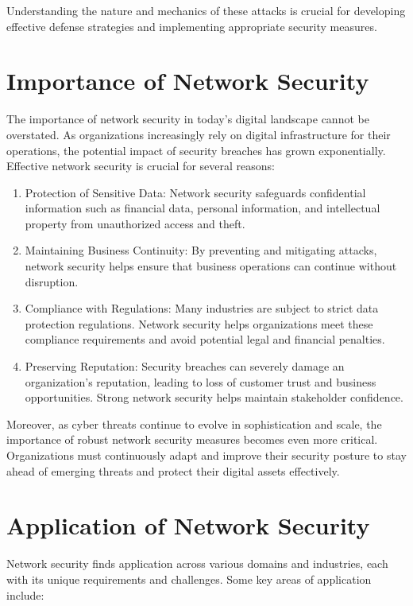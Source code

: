 \documentclass{article}
\begin{document}
Understanding the nature and mechanics of these attacks is crucial for developing effective defense strategies and implementing appropriate security measures.

\section{Importance of Network Security}

The importance of network security in today's digital landscape cannot be overstated. As organizations increasingly rely on digital infrastructure for their operations, the potential impact of security breaches has grown exponentially. Effective network security is crucial for several reasons:

\begin{enumerate}
    \item Protection of Sensitive Data: Network security safeguards confidential information such as financial data, personal information, and intellectual property from unauthorized access and theft.
    \item Maintaining Business Continuity: By preventing and mitigating attacks, network security helps ensure that business operations can continue without disruption.
    \item Compliance with Regulations: Many industries are subject to strict data protection regulations. Network security helps organizations meet these compliance requirements and avoid potential legal and financial penalties.
    \item Preserving Reputation: Security breaches can severely damage an organization's reputation, leading to loss of customer trust and business opportunities. Strong network security helps maintain stakeholder confidence.
\end{enumerate}

Moreover, as cyber threats continue to evolve in sophistication and scale, the importance of robust network security measures becomes even more critical. Organizations must continuously adapt and improve their security posture to stay ahead of emerging threats and protect their digital assets effectively.

\section{Application of Network Security}

Network security finds application across various domains and industries, each with its unique requirements and challenges. Some key areas of application include:
\end{document}
